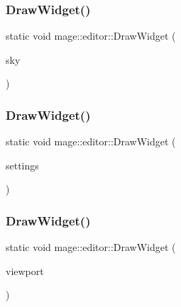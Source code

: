 \hypertarget{namespacemage_1_1editor_aeb0dbc0b7110bc339319058efb474acb}{}\label{namespacemage_1_1editor_aeb0dbc0b7110bc339319058efb474acb} 
\subsubsection{\texorpdfstring{Draw\+Widget()}{DrawWidget()}\hspace{0.1cm}{\footnotesize\ttfamily [3/20]}}
{\footnotesize\ttfamily static void mage\+::editor\+::\+Draw\+Widget (\begin{DoxyParamCaption}\item[{\hyperlink{classmage_1_1_sky}{Sky} \&}]{sky }\end{DoxyParamCaption})\hspace{0.3cm}{\ttfamily [static]}}

\hypertarget{namespacemage_1_1editor_a462a40b06ba74c058462c4afd3927dcc}{}\label{namespacemage_1_1editor_a462a40b06ba74c058462c4afd3927dcc} 
\subsubsection{\texorpdfstring{Draw\+Widget()}{DrawWidget()}\hspace{0.1cm}{\footnotesize\ttfamily [4/20]}}
{\footnotesize\ttfamily static void mage\+::editor\+::\+Draw\+Widget (\begin{DoxyParamCaption}\item[{\hyperlink{classmage_1_1_camera_settings}{Camera\+Settings} \&}]{settings }\end{DoxyParamCaption})\hspace{0.3cm}{\ttfamily [static]}}

\hypertarget{namespacemage_1_1editor_a7ecf1da7b0f7e65171180d25275ab743}{}\label{namespacemage_1_1editor_a7ecf1da7b0f7e65171180d25275ab743} 
\subsubsection{\texorpdfstring{Draw\+Widget()}{DrawWidget()}\hspace{0.1cm}{\footnotesize\ttfamily [5/20]}}
{\footnotesize\ttfamily static void mage\+::editor\+::\+Draw\+Widget (\begin{DoxyParamCaption}\item[{\hyperlink{classmage_1_1_viewport}{Viewport} \&}]{viewport }\end{DoxyParamCaption})\hspace{0.3cm}{\ttfamily [static]}}


